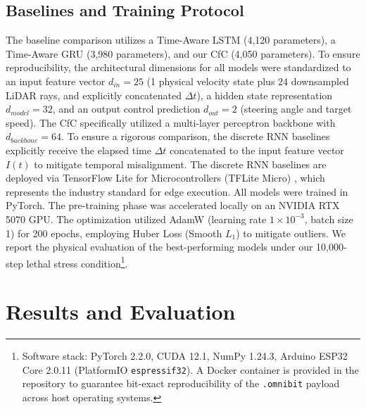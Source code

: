 \documentclass[conference]{IEEEtran}
\begin{document}
\subsection{Baselines and Training Protocol}
The baseline comparison utilizes a Time-Aware LSTM (4,120 parameters), a Time-Aware GRU (3,980 parameters), and our CfC (4,050 parameters). To ensure reproducibility, the architectural dimensions for all models were standardized to an input feature vector $d_{in} = 25$ (1 physical velocity state plus 24 downsampled LiDAR rays, and explicitly concatenated $\Delta t$), a hidden state representation $d_{model} = 32$, and an output control prediction $d_{out} = 2$ (steering angle and target speed). The CfC specifically utilized a multi-layer perceptron backbone with $d_{backbone} = 64$. To ensure a rigorous comparison, the discrete RNN baselines explicitly receive the elapsed time $\Delta t$ concatenated to the input feature vector $I(t)$ to mitigate temporal misalignment. The discrete RNN baselines are deployed via TensorFlow Lite for Microcontrollers (TFLite Micro) \cite{david2021tflitemicro}, which represents the industry standard for edge execution. All models were trained in PyTorch. The pre-training phase was accelerated locally on an NVIDIA RTX 5070 GPU. The optimization utilized AdamW \cite{kingma2014adam, loshchilov2017decoupled} (learning rate $1\times10^{-3}$, batch size 1) for 200 epochs, employing Huber Loss (Smooth $L_1$) to mitigate outliers. We report the physical evaluation of the best-performing models under our 10,000-step lethal stress condition\footnote{Software stack: PyTorch 2.2.0, CUDA 12.1, NumPy 1.24.3, Arduino ESP32 Core 2.0.11 (PlatformIO \texttt{espressif32}). A Docker container is provided in the repository to guarantee bit-exact reproducibility of the \texttt{.omnibit} payload across host operating systems.}.

\section{Results and Evaluation}
\end{document}

